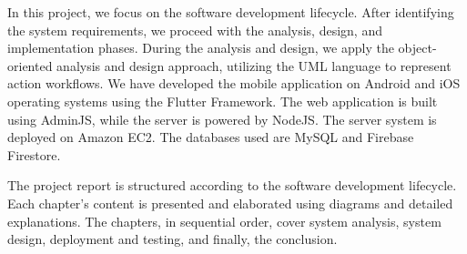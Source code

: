 In this project, we focus on the software development lifecycle. After identifying the system requirements, we proceed with the analysis, design, and implementation phases. During the analysis and design, we apply the object-oriented analysis and design approach, utilizing the UML language to represent action workflows. We have developed the mobile application on Android and iOS operating systems using the Flutter Framework. The web application is built using AdminJS, while the server is powered by NodeJS. The server system is deployed on Amazon EC2. The databases used are MySQL and Firebase Firestore.

The project report is structured according to the software development lifecycle. Each chapter's content is presented and elaborated using diagrams and detailed explanations. The chapters, in sequential order, cover system analysis, system design, deployment and testing, and finally, the conclusion.
\cleardoublepage



